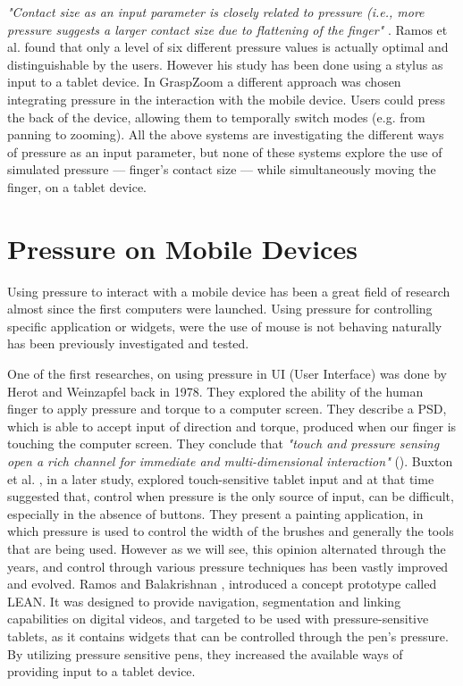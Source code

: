 \emph{"Contact size as an input parameter is closely related to pressure (i.e., more pressure suggests a larger contact size due to flattening of the finger"} \textbf{\cite{Boring2012}}. Ramos et al. \cite{Ramos2004} found that only a level of six different pressure values is actually optimal and distinguishable by the users. However his study has been done using a stylus as input to a tablet device. In GraspZoom \cite{Miyaki:2009:GZS:1613858.1613872} a different approach was chosen integrating pressure in the interaction with the mobile device. Users could press the back of the device, allowing them to temporally switch modes (e.g. from panning to zooming). All the above systems are investigating the different ways of pressure as an input parameter, but none of these systems explore the use of simulated pressure --- finger's contact size --- while simultaneously moving the finger, on a tablet device.



\section{Pressure on Mobile Devices}
\label{sec:pressureMobileDevices}

Using pressure to interact with a mobile device has been a great field of research almost since the first computers were launched. Using pressure for controlling specific application or widgets, were the use of mouse is not behaving naturally has been previously investigated and tested.

One of the first researches, on using pressure in UI (User Interface) was done by Herot and Weinzapfel \cite{Herot:1978:OTI:965139.807392} back in 1978. They explored the ability of the human finger to apply pressure and torque to a computer screen. They describe a PSD, which is able to accept input of direction and torque, produced when our finger is touching the computer screen. They conclude that \emph{"touch and pressure sensing open a rich channel for immediate and multi-dimensional interaction"} (\cite{Herot:1978:OTI:965139.807392}).
Buxton et al. \cite{Buxton:1985:ITT:325165.325239}, in a later study, explored touch-sensitive tablet input and at that time suggested that, control when pressure is the only source of input, can be difficult, especially in the absence of buttons. They present a painting application, in which pressure is used to control the width of the brushes and generally the tools that are being used. However as we will see, this opinion alternated through the years, and control through various pressure techniques has been vastly improved and evolved.
Ramos and Balakrishnan \cite{Ramos:2003:FIT:964696.964708}, introduced a concept prototype called LEAN. It was designed to provide navigation, segmentation and linking capabilities on digital videos, and targeted to be used with pressure-sensitive tablets, as it contains widgets that can be controlled through the pen's pressure. By utilizing pressure sensitive pens, they increased the available ways of providing input to a tablet device.

